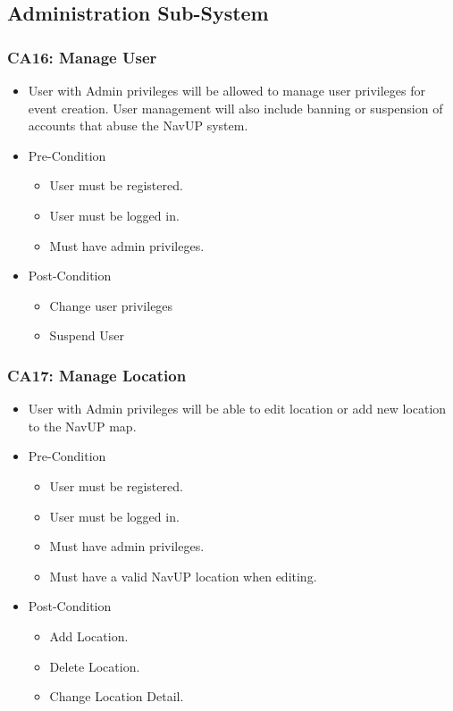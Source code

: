 \documentclass[12pt,a4paper]{article}
\begin{document}
	\subsection{Administration Sub-System}
		\subsubsection{CA16: Manage User}
			\begin{itemize}
				\item User with Admin privileges will be allowed to manage user privileges for event creation. User management will also include banning or suspension of accounts that abuse the NavUP system.
				\item Pre-Condition
					\begin{itemize}
						\item User must be registered.
						\item User must be logged in.
						\item Must have admin privileges.
					\end{itemize}
				\item Post-Condition
					\begin{itemize}
						\item Change user privileges
						\item Suspend User
					\end{itemize}
			\end{itemize}
		\subsubsection{CA17: Manage Location}
			\begin{itemize}
				\item User with Admin privileges will be able to edit location or add new location to the NavUP map.
				\item Pre-Condition
					\begin{itemize}
						\item User must be registered.
						\item User must be logged in.
						\item Must have admin privileges.
						\item Must have a valid NavUP location when editing.
					\end{itemize}
				\item Post-Condition
					\begin{itemize}
						\item Add Location.
						\item Delete Location.
						\item Change Location Detail.
					\end{itemize}
			\end{itemize}
\end{document}
